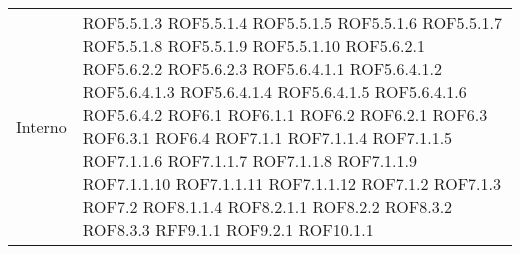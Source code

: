 \begin{center}
\begin{longtable}{| p{4cm} | p{4cm} |}
\hline
Interno & ROF5.5.1.3 \newline ROF5.5.1.4 \newline ROF5.5.1.5 \newline ROF5.5.1.6 \newline ROF5.5.1.7 \newline ROF5.5.1.8 \newline ROF5.5.1.9 \newline ROF5.5.1.10 \newline ROF5.6.2.1 \newline ROF5.6.2.2 \newline ROF5.6.2.3 \newline ROF5.6.4.1.1 \newline ROF5.6.4.1.2 \newline ROF5.6.4.1.3 \newline ROF5.6.4.1.4 \newline ROF5.6.4.1.5 \newline ROF5.6.4.1.6 \newline ROF5.6.4.2 \newline ROF6.1 \newline ROF6.1.1 \newline ROF6.2 \newline ROF6.2.1 \newline ROF6.3 \newline ROF6.3.1 \newline ROF6.4 \newline ROF7.1.1 \newline ROF7.1.1.4 \newline ROF7.1.1.5 \newline ROF7.1.1.6 \newline ROF7.1.1.7 \newline ROF7.1.1.8 \newline ROF7.1.1.9 \newline ROF7.1.1.10 \newline ROF7.1.1.11 \newline ROF7.1.1.12 \newline ROF7.1.2 \newline ROF7.1.3 \newline ROF7.2 \newline ROF8.1.1.4 \newline ROF8.2.1.1 \newline ROF8.2.2 \newline ROF8.3.2 \newline ROF8.3.3 \newline RFF9.1.1 \newline ROF9.2.1 \newline ROF10.1.1 \\

\end{longtable}
\end{center}

